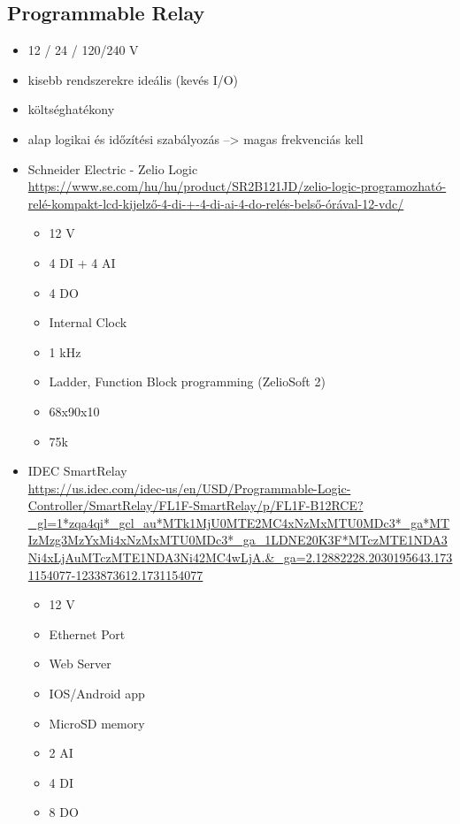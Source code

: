 \documentclass{article}
\begin{document}
	\subsection{Programmable Relay}
	
	\begin{itemize}
		\item 12 / 24 / 120/240 V 
		\item kisebb rendszerekre ideális (kevés I/O)
		\item költséghatékony
		\item alap logikai és időzítési szabályozás --> magas frekvenciás kell
	\end{itemize}
	
	
	\begin{itemize}
		\item Schneider Electric - Zelio Logic\\
			\url{https://www.se.com/hu/hu/product/SR2B121JD/zelio-logic-programozható-relé-kompakt-lcd-kijelző-4-di-+-4-di-ai-4-do-relés-belső-órával-12-vdc/}
			\begin{itemize}
				\item 12 V
				\item 4 DI + 4 AI
				\item 4 DO
				\item Internal Clock
				\item 1 kHz
				\item Ladder, Function Block programming (ZelioSoft 2)
				\item 68x90x10
				\item 75k
			\end{itemize}
		\item IDEC SmartRelay\\
			\url{https://us.idec.com/idec-us/en/USD/Programmable-Logic-Controller/SmartRelay/FL1F-SmartRelay/p/FL1F-B12RCE?_gl=1*zqa4qi*_gcl_au*MTk1MjU0MTE2MC4xNzMxMTU0MDc3*_ga*MTIzMzg3MzYxMi4xNzMxMTU0MDc3*_ga_1LDNE20K3F*MTczMTE1NDA3Ni4xLjAuMTczMTE1NDA3Ni42MC4wLjA.&_ga=2.12882228.2030195643.1731154077-1233873612.1731154077}
			\begin{itemize}
				\item 12 V
				\item Ethernet Port
				\item Web Server
				\item IOS/Android app
				\item MicroSD memory
				\item 2 AI
				\item 4 DI
				\item 8 DO

\end{itemize}
\end{itemize}
\end{document}

